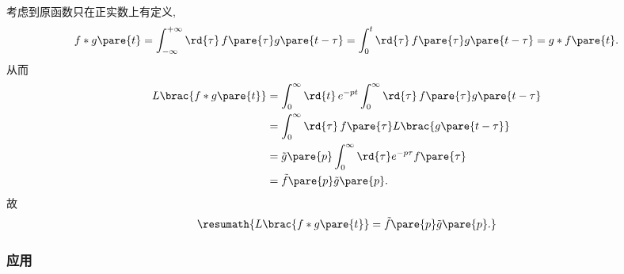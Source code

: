 \documentclass[hidelinks]{ctexart}
\begin{document}
考虑到原函数只在正实数上有定义,
\[ f*g\pare{t} = \int_{-\infty}^{+\infty} \rd{\tau}\,f\pare{\tau}g\pare{t-\tau} = \int_0^t \rd{\tau}\, f\pare{\tau}g\pare{t-\tau} = g*f\pare{t}. \]
从而
\begin{align*}
    L\brac{f*g\pare{t}} &= \int_0^\infty \rd{t}\, e^{-pt}\int_0^\infty \rd{\tau}\, f\pare{\tau} g\pare{t-\tau} \\
    &= \int_0^\infty \rd{\tau}\, f\pare{\tau} L\brac{g\pare{t-\tau}} \\
    &= \tilde{g}\pare{p} \int_0^\infty \rd{\tau} e^{-p \tau}f\pare{\tau} \\
    &= \tilde{f}\pare{p} \tilde{g}\pare{p}.
\end{align*}
故
\[ \resumath{L\brac{f*g\pare{t}} = \tilde{f}\pare{p}\tilde{g}\pare{p}.} \]



\subsubsection{应用} %
\label{ssub:应用}
\end{document}
